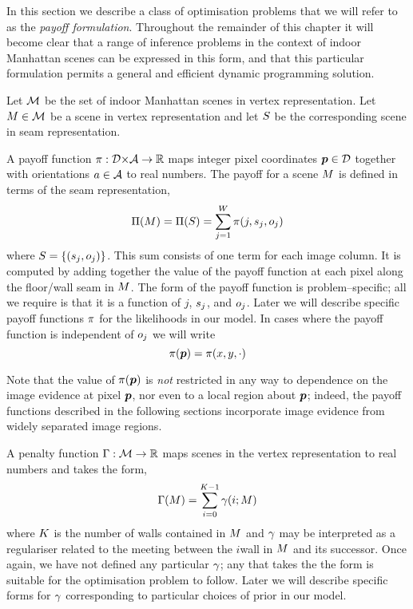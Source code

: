 In this section we describe a class of optimisation problems that we
will refer to as the \textit{payoff formulation}. Throughout the
remainder of this chapter it will become clear that a range of
inference problems in the context of indoor Manhattan scenes can be
expressed in this form, and that this particular formulation permits a
general and efficient dynamic programming solution.

Let $\SetOfScenes$ be the set of indoor Manhattan scenes in vertex
representation. Let $\Scene\in\SetOfScenes$ be a scene in vertex
representation and let $\Seam$ be the corresponding scene in
seam representation. 

A payoff function $\PixelPayoff: \Dom\cross\SetOfOrientations
\Mapto\Reals$ maps integer pixel coordinates $\Pixel\in\Dom$ together
with orientations $\Orient\in\SetOfOrientations$ to real numbers. The
payoff for a scene $\Scene$ is defined in terms of the seam
representation,
\begin{equation}
  \label{eq:scene-payoff}
  \ScenePayoff(\Scene) = 
  \ScenePayoff(\Seam) =
  \sum_{j=1}^{\Width} \PixelPayoff(j,\seam_j,\WallOrient_j)
\end{equation}
where $\Seam = \{(\seam_j,\WallOrient_j)\}$. This sum consists of one
term for each image column. It is computed by adding together the
value of the payoff function at each pixel along the floor/wall seam
in $\Scene$. The form of the payoff function is problem--specific; all
we require is that it is a function of $j$, $\seam_j$, and
$\WallOrient_j$. Later we will describe specific payoff functions
$\PixelPayoff$ for the likelihoods in our model. In cases where the
payoff function is independent of $\WallOrient_j$ we will write
\begin{equation}
  \PixelPayoff(\Pixel) = \PixelPayoff(x,y,\cdot)
\end{equation}

Note that the value of $\PixelPayoff(\Pixel)$ is \textit{not}
restricted in any way to dependence on the image evidence at pixel
$\Pixel$, nor even to a local region about $\Pixel$; indeed, the
payoff functions described in the following sections incorporate image
evidence from widely separated image regions.

A penalty function $\ScenePenalty:\SetOfScenes\Mapto\Reals$ maps
scenes in the vertex representation to real numbers and takes the form,
\begin{equation}
  \label{eq:scene-penalty}
  \ScenePenalty(\Scene) = 
  \sum_{i=0}^{\NumWalls-1} \CornerPenalty(i;\Scene)
\end{equation}
where $\NumWalls$ is the number of walls contained in $\Scene$ and
$\CornerPenalty$ may be interpreted as a regulariser related to the
meeting between the $i$\th wall in $\Scene$ and its successor. Once
again, we have not defined any particular $\CornerPenalty$; any that
takes the the form  is suitable for the
optimisation problem to follow. Later we will describe specific forms
for $\CornerPenalty$ corresponding to particular choices of prior in
our model.


